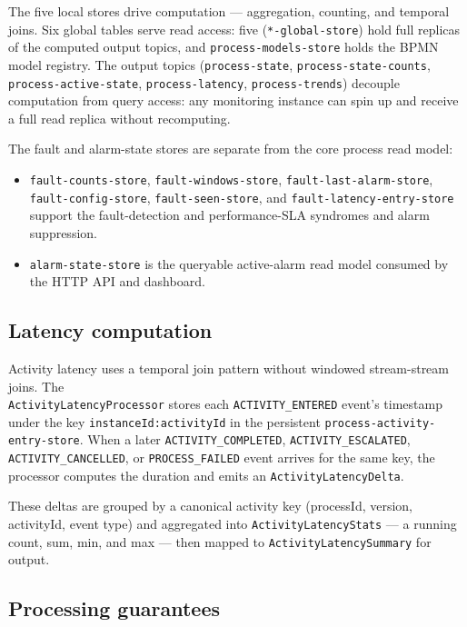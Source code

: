 The five local stores drive computation — aggregation, counting, and temporal joins.
Six global tables serve read access: five (\texttt{*-global-store}) hold full replicas
of the computed output topics, and \texttt{process-models-store} holds the BPMN model
registry. The output topics (\texttt{process-state},
\texttt{process-state-counts}, \\ \texttt{process-active-state}, \texttt{process-latency},
\texttt{process-trends}) decouple computation from query access: any monitoring instance
can spin up and receive a full read replica without recomputing.

The fault and alarm-state stores are separate from the core process read model:

\begin{itemize}
\item \texttt{fault-counts-store}, \texttt{fault-windows-store},
      \texttt{fault-last-alarm-store}, \texttt{fault-config-store},
      \texttt{fault-seen-store}, and \texttt{fault-latency-entry-store} support the
      fault-detection and performance-SLA syndromes and alarm suppression.
\item \texttt{alarm-state-store} is the queryable active-alarm read model consumed by
      the HTTP API and dashboard.
\end{itemize}

\subsection{Latency computation}

Activity latency uses a temporal join pattern without windowed stream-stream joins.
The \\ \texttt{ActivityLatencyProcessor} stores each \texttt{ACTIVITY\_ENTERED} event's
timestamp under the key \texttt{instanceId:activityId} in the persistent
\texttt{process-activity-entry-store}. When a later \texttt{ACTIVITY\_COMPLETED},
\texttt{ACTIVITY\_ESCALATED}, \texttt{ACTIVITY\_CANCELLED}, or \texttt{PROCESS\_FAILED}
event arrives for the same
key, the processor computes the duration and emits an \texttt{ActivityLatencyDelta}.

These deltas are grouped by a canonical activity key (processId, version, activityId,
event type) and aggregated into \texttt{ActivityLatencyStats} — a running count,
sum, min, and max — then mapped to \texttt{ActivityLatencySummary} for output.

\subsection{Processing guarantees}


